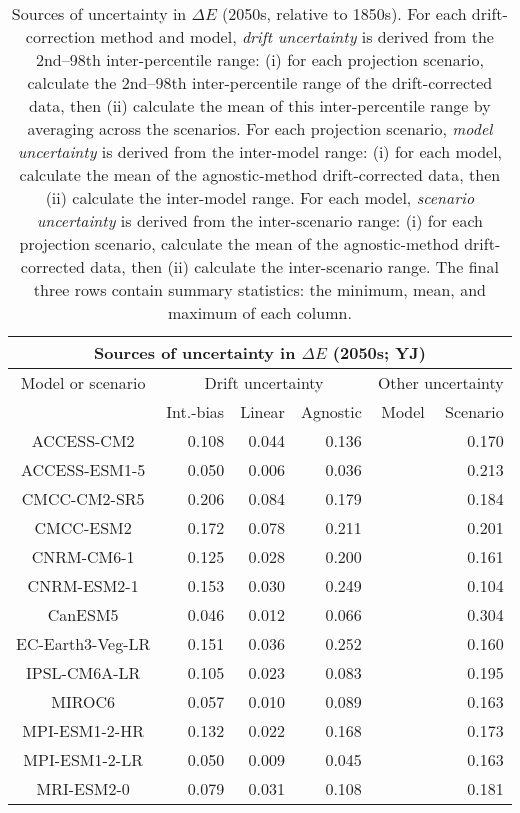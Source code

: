 \begin{table*}[t]
\centering
\caption{Sources of uncertainty in $\Delta E$ (2050s, relative to 1850s). For each drift-correction method and model, \emph{drift uncertainty} is derived from the 2nd--98th inter-percentile range: (i) for each projection scenario, calculate the 2nd--98th inter-percentile range of the drift-corrected data, then (ii) calculate the mean of this inter-percentile range by averaging across the scenarios. For each projection scenario, \emph{model uncertainty} is derived from the inter-model range: (i) for each model, calculate the mean of the agnostic-method drift-corrected data, then (ii) calculate the inter-model range. For each model, \emph{scenario uncertainty} is derived from the inter-scenario range: (i) for each projection scenario, calculate the mean of the agnostic-method drift-corrected data, then (ii) calculate the inter-scenario range. The final three rows contain summary statistics: the minimum, mean, and maximum of each column.}
\begin{tabular}{c|rrr|rr}
\toprule
\multicolumn{6}{c}{Sources of uncertainty in $\Delta E$ (2050s; YJ)} \\ 
\midrule
Model or scenario & \multicolumn{3}{c|}{Drift uncertainty} & \multicolumn{2}{c}{Other uncertainty} \\
 & Int.-bias & Linear & Agnostic & Model & Scenario \\
\midrule
ACCESS-CM2 & 0.108 & 0.044 & 0.136 &  & 0.170 \\
ACCESS-ESM1-5 & 0.050 & 0.006 & 0.036 &  & 0.213 \\
CMCC-CM2-SR5 & 0.206 & 0.084 & 0.179 &  & 0.184 \\
CMCC-ESM2 & 0.172 & 0.078 & 0.211 &  & 0.201 \\
CNRM-CM6-1 & 0.125 & 0.028 & 0.200 &  & 0.161 \\
CNRM-ESM2-1 & 0.153 & 0.030 & 0.249 &  & 0.104 \\
CanESM5 & 0.046 & 0.012 & 0.066 &  & 0.304 \\
EC-Earth3-Veg-LR & 0.151 & 0.036 & 0.252 &  & 0.160 \\
IPSL-CM6A-LR & 0.105 & 0.023 & 0.083 &  & 0.195 \\
MIROC6 & 0.057 & 0.010 & 0.089 &  & 0.163 \\
MPI-ESM1-2-HR & 0.132 & 0.022 & 0.168 &  & 0.173 \\
MPI-ESM1-2-LR & 0.050 & 0.009 & 0.045 &  & 0.163 \\
MRI-ESM2-0 & 0.079 & 0.031 & 0.108 &  & 0.181 \\

\end{tabular}
\end{table*}
